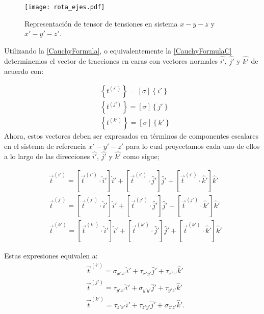 \documentclass[../notas medios.tex]{subfiles}
\begin{document}
\begin{figure}[H]
\centering
	\texttt{[image: rota\_ejes.pdf]}
	\caption{Representación de tensor de tensiones en sistema $x-y-z$ y $x'-y'-z'$.}
	\label{roteje}
\end{figure}


Utilizando la \cref{CauchyFormula}, o equivalentemente la \cref{CauchyFormulaC} determinemos el vector de tracciones en caras
con vectores normales $\hat{i'}$, $\hat{j'}$ y $\hat{k'}$ de acuerdo con:
%

\begin{equation}
\begin{aligned}
&\left\{ {{t^{(i')}}} \right\} = \left[ \sigma  \right]\left\{ i' \right\} \\
&\left\{ {{t^{(j')}}} \right\} = \left[ \sigma  \right]\left\{ j' \right\} \\
&\left\{ {{t^{(k')}}} \right\} = \left[ \sigma  \right]\left\{ k' \right\}
\end{aligned}
\label{proy1}
\end{equation}
%
Ahora, estos vectores deben ser expresados en términos de componentes escalares en el sistema de referencia $x'-y'-z'$ para lo cual proyectamos cada uno de ellos a lo largo de las direcciones $\hat{i'}$, $\hat{j'}$ y $\hat{k'}$ como sigue;

\begin{equation}
\begin{aligned}
&{{\vec t}^{(i')}} = [{{\vec t}^{(i')}} \cdot \hat i']\hat i' + [{{\vec t}^{(i')}} \cdot \hat j']\hat j' + [{{\vec t}^{(i')}} \cdot \hat k']\hat k' \\
&{{\vec t}^{(j')}} = [{{\vec t}^{(j')}} \cdot \hat i']\hat i' + [{{\vec t}^{(j')}} \cdot \hat j']\hat j' + [{{\vec t}^{(j')}} \cdot \hat k']\hat k' \\
&{{\vec t}^{(k')}} = [{{\vec t}^{(k')}} \cdot \hat i']\hat i' + [{{\vec t}^{(k')}} \cdot \hat j']\hat j' + [{{\vec t}^{(k')}} \cdot \hat k']\hat k'
\end{aligned}
\label{proy2}
\end{equation}


%

%

Estas expresiones equivalen a:
%
\begin{align*}
& {{\vec t}^{(i')}} = {\sigma _{x'x'}}\hat i' + {\tau _{x'y'}}\hat j' + {\tau _{x'z'}}\hat k' \\
& {{\vec t}^{(j')}} = {\tau _{y'x'}}\hat i' + {\sigma _{y'y'}}\hat j' + {\tau _{y'z'}}\hat k' \\
&{{\vec t}^{(k')}} = {\tau _{z'x'}}\hat i' + {\tau _{z'y'}}\hat j' + {\sigma _{z'z'}}\hat k'.
\end{align*} \\
\end{document}
